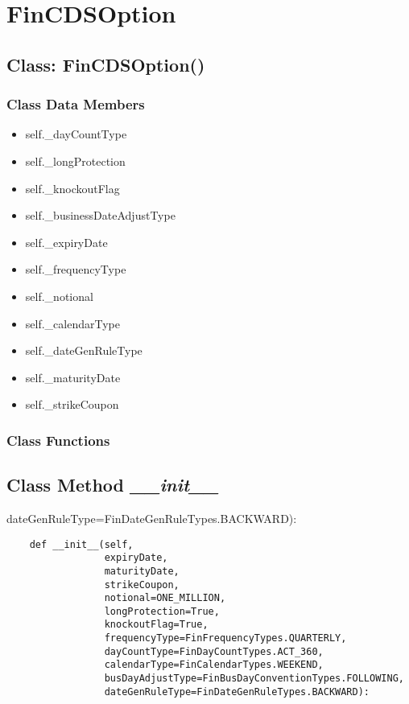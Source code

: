 \documentclass[twoside,11pt]{book}
\begin{document}
\newpage
\section{FinCDSOption}

\subsection{Class: FinCDSOption()}


\subsubsection{Class Data Members}
\begin{itemize}
\item{self.\_dayCountType}
\item{self.\_longProtection}
\item{self.\_knockoutFlag}
\item{self.\_businessDateAdjustType}
\item{self.\_expiryDate}
\item{self.\_frequencyType}
\item{self.\_notional}
\item{self.\_calendarType}
\item{self.\_dateGenRuleType}
\item{self.\_maturityDate}
\item{self.\_strikeCoupon}
\end{itemize}

\subsubsection{Class Functions}

\subsection{Class Method {\it \_\_init\_\_}}
dateGenRuleType=FinDateGenRuleTypes.BACKWARD):

\begin{lstlisting}
    def __init__(self,
                 expiryDate,
                 maturityDate,
                 strikeCoupon,
                 notional=ONE_MILLION,
                 longProtection=True,
                 knockoutFlag=True,
                 frequencyType=FinFrequencyTypes.QUARTERLY,
                 dayCountType=FinDayCountTypes.ACT_360,
                 calendarType=FinCalendarTypes.WEEKEND,
                 busDayAdjustType=FinBusDayConventionTypes.FOLLOWING,
                 dateGenRuleType=FinDateGenRuleTypes.BACKWARD):
\end{lstlisting}
\end{document}
